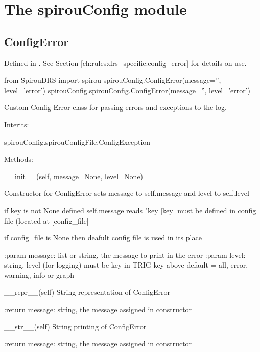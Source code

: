 
\clearpage
\newpage
\begin{minipage}{\textwidth}
\section{The spirouConfig module}
\label{ch:the_module:spirouConfig}

\subsection{ConfigError}
\label{ch:the_module:spirouConfig:ConfigError}

Defined in \spirouConfig{}.
See Section \ref{ch:rules:drs_specific:config_error} for details on use.

\begin{pythonbox}
from SpirouDRS import spirou
spirouConfig.ConfigError(message='', level='error')
spirouConfig.spirouConfig.ConfigError(message='', level='error')
\end{pythonbox}

\begin{pythondocstring}
Custom Config Error class for passing errors and exceptions to the log.

Interits:

	spirouConfig.spirouConfigFile.ConfigException

Methods:

	__init__(self, message=None, level=None)

		Constructor for ConfigError sets message to self.message and level to
		self.level

		if key is not None defined self.message reads "key [key] must be
		defined in config file (located at [config_file]

		if config_file is None then deafult config file is used in its place

		:param message: list or string, the message to print in the error
		:param level: string, level (for logging) must be key in TRIG key above
		              default = all, error, warning, info or graph

	__repr__(self)
	    String representation of ConfigError
	    
	    :return message: string, the message assigned in constructor 

	__str__(self)
	    String printing of ConfigError

	    :return message: string, the message assigned in constructor

\end{pythondocstring}
\end{minipage}

